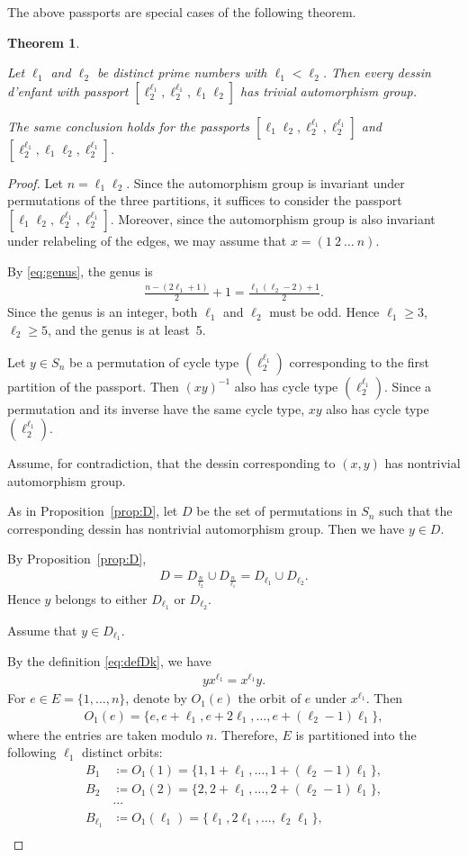 \documentclass[12pt,reqno]{amsart}
\newcommand{\HL}{\vspace{2mm}}							%
\newcommand{\f}[2]{\frac{#1}{#2}}							%
\newcommand{\ceq}{\coloneqq} 							%
\theoremstyle{mythmstyle}
\newtheorem{thm}[lemma]{Theorem}
\theoremstyle{mydefstyle}
\newcommand{\propref}[1]{Proposition~\ref{#1}}
\newcommand{\dde}{dessin d'enfant\xspace}
\newcommand{\sigman}{(1\ 2\ \ldots\ n)}
\numberwithin{equation}{section}
\newcommand{\thmtrivautd}{
Let $\ell_{1}$ and $\ell_{2}$ be distinct prime numbers with
$\ell_{1} < \ell_{2}$.
Then every \dde with passport
$[\ell_{2}^{\ell_{1}}, \ell_{2}^{\ell_{1}}, \ell_{1}\ell_{2}]$
has trivial automorphism group.

The same conclusion holds for the passports
$[\ell_{1}\ell_{2}, \ell_{2}^{\ell_{1}}, \ell_{2}^{\ell_{1}}]$
and
$[\ell_{2}^{\ell_{1}}, \ell_{1}\ell_{2}, \ell_{2}^{\ell_{1}}]$.}
\begin{document}
The above passports are special cases of the following theorem.

\begin{thm}
\label{thm:trivautd}
\thmtrivautd
\end{thm}

\begin{proof}
Let $n = \ell_{1}\ell_{2}$.
Since the automorphism group is invariant under permutations of the three partitions,
it suffices to consider the passport
$[\ell_{1}\ell_{2}, \ell_{2}^{\ell_{1}}, \ell_{2}^{\ell_{1}}]$.
Moreover, since the automorphism group is also invariant under relabeling of the edges,
we may assume that $x = \sigman$.

By \eqref{eq:genus}, the genus is
\begin{align}
\f{n-(2\ell_{1}+1)}{2}+1
=
\f{\ell_{1}(\ell_{2}-2)+1}{2}.
\end{align}
Since the genus is an integer, both $\ell_{1}$ and $\ell_{2}$ must be odd.
Hence $\ell_{1} \ge 3$, $\ell_{2} \ge 5$, and the genus is at least~5.

Let $y \in S_n$ be a permutation of cycle type
$(\ell_2^{\ell_1})$ corresponding to the first partition of the passport.
Then $(xy)^{-1}$ also has cycle type $(\ell_2^{\ell_1})$.
Since a permutation and its inverse have the same cycle type,
$xy$ also has cycle type $(\ell_2^{\ell_1})$.

Assume, for contradiction, that the dessin corresponding to $(x,y)$ has nontrivial automorphism group.

As in \propref{prop:D}, let $D$ be the set of permutations in $S_n$
such that the corresponding dessin has nontrivial automorphism group.
Then we have $y \in D$.

By \propref{prop:D},
\begin{align}
D = D_{\f{n}{\ell_{2}}} \cup D_{\f{n}{\ell_{1}}} = D_{\ell_{1}} \cup D_{\ell_{2}}.
\end{align}
Hence $y$ belongs to either $D_{\ell_1}$ or $D_{\ell_2}$.
\HL

\item[(i)] Assume that $y \in D_{\ell_{1}}$.

By the definition \eqref{eq:defDk}, we have
\begin{align}
\label{eq:ycomm1}
yx^{\ell_{1}} = x^{\ell_{1}}y.
\end{align}
For $e \in E = \{ 1, \ldots, n \}$, denote by $O_{1}(e)$ the orbit of $e$ under $x^{\ell_{1}}$.
Then
\begin{align}
O_{1}(e) = \{ e, e+\ell_{1}, e+2\ell_{1}, \ldots, e+(\ell_{2}-1)\ell_{1} \},
\end{align}
where the entries are taken modulo $n$. Therefore, $E$ is partitioned into the following
$\ell_1$ distinct orbits:
\begin{align}
B_{1} &\ceq O_{1}(1) = \{ 1, 1+\ell_{1}, \ldots, 1 + (\ell_{2}-1)\ell_{1} \}, \\
B_{2} &\ceq O_{1}(2) = \{ 2, 2+\ell_{1}, \ldots, 2 + (\ell_{2}-1)\ell_{1} \}, \\
&\cdots \\
B_{\ell_{1}} &\ceq O_{1}(\ell_{1}) = \{ \ell_{1}, 2\ell_{1}, \ldots, \ell_{2}\ell_{1} \}, \\
\end{align}


\end{proof}
\end{document}
